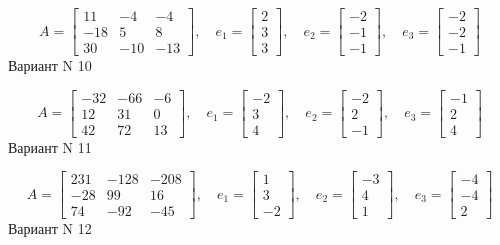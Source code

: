 \documentclass[11pt]{report}
\begin{document}
$$A = \left[\begin{matrix}11 & -4 & -4\\-18 & 5 & 8\\30 & -10 & -13\end{matrix}\right],\quad e_1 = \left[\begin{matrix}2\\3\\3\end{matrix}\right],\quad e_2 = \left[\begin{matrix}-2\\-1\\-1\end{matrix}\right],\quad e_3 = \left[\begin{matrix}-2\\-2\\-1\end{matrix}\right]$$Вариант N 10

$$A = \left[\begin{matrix}-32 & -66 & -6\\12 & 31 & 0\\42 & 72 & 13\end{matrix}\right],\quad e_1 = \left[\begin{matrix}-2\\3\\4\end{matrix}\right],\quad e_2 = \left[\begin{matrix}-2\\2\\-1\end{matrix}\right],\quad e_3 = \left[\begin{matrix}-1\\2\\4\end{matrix}\right]$$Вариант N 11

$$A = \left[\begin{matrix}231 & -128 & -208\\-28 & 99 & 16\\74 & -92 & -45\end{matrix}\right],\quad e_1 = \left[\begin{matrix}1\\3\\-2\end{matrix}\right],\quad e_2 = \left[\begin{matrix}-3\\4\\1\end{matrix}\right],\quad e_3 = \left[\begin{matrix}-4\\-4\\2\end{matrix}\right]$$Вариант N 12
\end{document}
